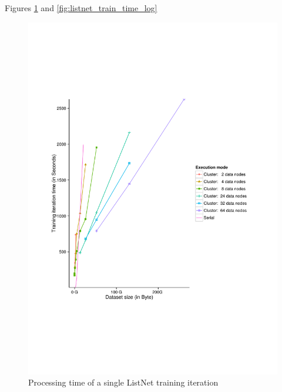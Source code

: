 Figures \ref{fig:listnet_train_time} and \ref{fig:listnet_train_time_log}

\begin{figure}
\centering
\includegraphics[trim=0cm 5cm 0cm 5cm, scale=0.7]{gfx/time_single.pdf}
\caption{Processing time of a single ListNet training iteration}
\label{fig:listnet_train_time}
\end{figure}

